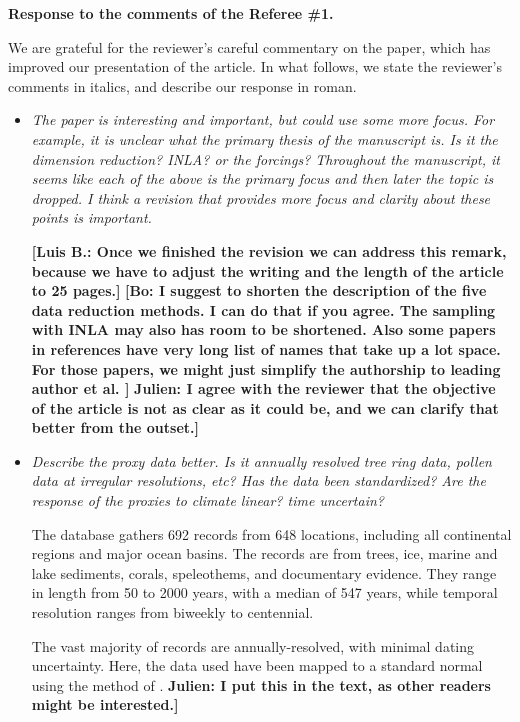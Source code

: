 \documentclass[11pt]{article}
\newcommand{\lb}[1]{\color{ForestGreen}\textbf{[Luis B.: #1]}\normalcolor}
\newcommand{\bl}[1]{\color{red}\textbf{[Bo: #1]}\normalcolor}
\newcommand{\jeg}[1]{\color{blue}\textbf{Julien: #1]}\normalcolor}
\begin{document}
\begin{center}
  {\Large \textbf{Response to the comments of the Referee \#1.}}
\end{center}

We are grateful for the reviewer's careful commentary on the paper, which has improved
our presentation of the article. In what follows, we state the reviewer's
comments in italics, and describe our response in roman.

\begin{itemize}
\item \textit{The paper is interesting and important, but could use some more
focus. For example, it is unclear what the primary thesis of the manuscript is.
Is it the dimension reduction? INLA? or the forcings? Throughout the manuscript,
it seems like each of the above is the primary focus and then later the topic is
dropped. I think a revision that provides more focus and clarity about these
points is important.
}

  \lb{Once we finished the revision we can address this remark, because we have
    to adjust the writing and the length of the article to 25 pages.}
  \bl{I suggest to shorten the description of the five data reduction methods. I can do that if you agree. The sampling with INLA may also has room to be shortened. Also some papers in references have very long list of names that take up a lot space. For those papers, we might just simplify the authorship to leading author et al. }
  \jeg{I agree with the reviewer that the objective of the article is not as clear as it could be, and we can clarify that better from the outset.}
  
\item \textit{Describe the proxy data better. Is it annually resolved tree ring
    data, pollen data at irregular resolutions, etc? Has the data been
    standardized? Are the response of the proxies to climate linear? time
    uncertain?}

  The database gathers 692 records from 648 locations, including all continental regions and major ocean basins. The records are from trees, ice, marine and lake sediments, corals, speleothems, and documentary evidence. They range in length from 50 to 2000 years, with a median of 547 years, while temporal resolution ranges from biweekly to centennial.

  The vast majority of records are annually-resolved, with minimal dating uncertainty. Here, the data used have been mapped to a standard normal using the method of \cite{vanAlbada2007}. \jeg{I put this in the text, as other readers might be interested.}
  

\end{itemize}
\end{document}
